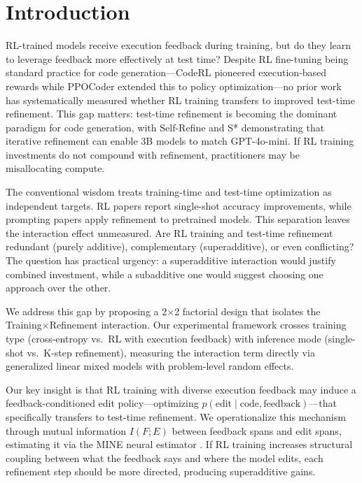 \section{Introduction}

RL-trained models receive execution feedback during training, but do they learn to leverage feedback more effectively at test time? Despite RL fine-tuning being standard practice for code generation---CodeRL \cite{le2022coderl} pioneered execution-based rewards while PPOCoder \cite{shojaee2023ppocoder} extended this to policy optimization---no prior work has systematically measured whether RL training transfers to improved test-time refinement. This gap matters: test-time refinement is becoming the dominant paradigm for code generation, with Self-Refine \cite{madaan2023selfrefine} and S* \cite{li2025sstar} demonstrating that iterative refinement can enable 3B models to match GPT-4o-mini. If RL training investments do not compound with refinement, practitioners may be misallocating compute.

The conventional wisdom treats training-time and test-time optimization as independent targets. RL papers report single-shot accuracy improvements, while prompting papers apply refinement to pretrained models. This separation leaves the interaction effect unmeasured. Are RL training and test-time refinement redundant (purely additive), complementary (superadditive), or even conflicting? The question has practical urgency: a superadditive interaction would justify combined investment, while a subadditive one would suggest choosing one approach over the other.

We address this gap by proposing a 2$\times$2 factorial design that isolates the Training$\times$Refinement interaction. Our experimental framework crosses training type (cross-entropy vs.\ RL with execution feedback) with inference mode (single-shot vs.\ K-step refinement), measuring the interaction term directly via generalized linear mixed models with problem-level random effects.

Our key insight is that RL training with diverse execution feedback may induce a feedback-conditioned edit policy---optimizing $p(\text{edit} \mid \text{code}, \text{feedback})$---that specifically transfers to test-time refinement. We operationalize this mechanism through mutual information $I(F;E)$ between feedback spans and edit spans, estimating it via the MINE neural estimator \cite{belghazi2018mine}. If RL training increases structural coupling between what the feedback says and where the model edits, each refinement step should be more directed, producing superadditive gains.

